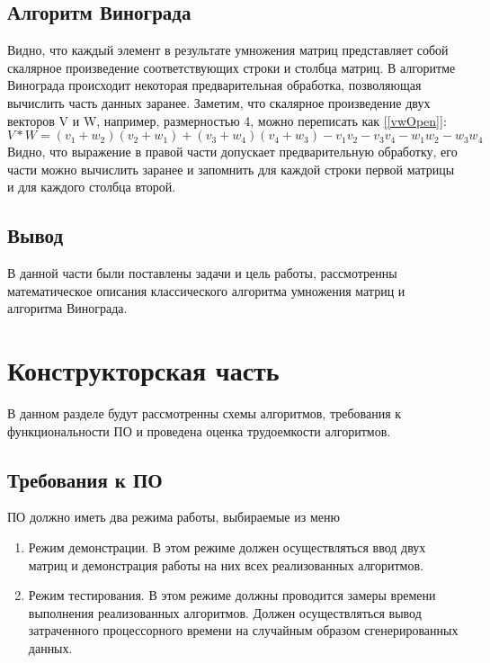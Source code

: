 \documentclass{article}
\begin{document}
		\subsection{Алгоритм Винограда}
		Видно, что каждый элемент в результате умножения матриц представляет собой скалярное произведение соответствующих строки и столбца матриц. В алгоритме Винограда происходит некоторая предварительная обработка, позволяющая вычислить часть данных заранее. Заметим, что скалярное произведение двух векторов V и W, например, размерностью 4, можно переписать как \hyperref[vwOpen]{[\ref{vwOpen}]}:
		\begin{equation}\label{vwOpen}
		V * W = (v_{1} + w_{2})(v_{2} + w_{1}) + (v_{3} + w_{4})(v_{4} + w_{3}) -  v_{1}v_{2} - v_{3}v_{4} - w_{1}w_{2} - w_{3}w_{4}
	\end{equation}
	\indent Видно, что выражение в правой части допускает предварительную обработку, его части можно вычислить заранее и запомнить для каждой строки первой матрицы и для каждого столбца второй.\cite{vinogradRef}
	\subsection{Вывод}
	В данной части были поставлены задачи и цель работы, рассмотренны математическое описания классического алгоритма умножения матриц и алгоритма Винограда.
		
	\newpage
	\section{Конструкторская часть}
		В данном разделе будут рассмотренны схемы алгоритмов, требования к функциональности ПО и проведена оценка трудоемкости алгоритмов.
		\subsection{Требования к ПО} 
		ПО должно иметь два режима работы, выбираемые из меню
		\begin{enumerate}
			\item Режим демонстрации. В этом режиме должен осуществляться ввод двух матриц и демонстрация работы на них всех реализованных алгоритмов.
		 	\item Режим тестирования. В этом режиме должны проводится замеры времени выполнения реализованных алгоритмов. Должен осуществляться вывод затраченного процессорного времени на случайным образом сгенерированных данных.
	 	\end{enumerate}
\end{document}

